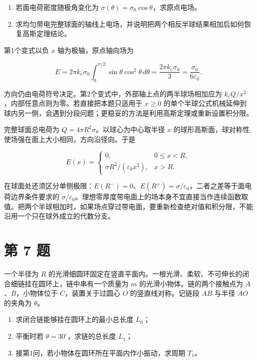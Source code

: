 \documentclass[12pt,a4paper,UTF8]{ctexart}
\newcommand{\tightlist}{\setlength{\itemsep}{0pt}\setlength{\parskip}{0pt}}
\begin{document}
\begin{enumerate}
\def\labelenumi{\arabic{enumi}.}
\tightlist
\item
  若面电荷密度随极角变化为
  \(\sigma(\theta)=\sigma_0\cos\theta\)，求原点电场。
\item
  求均匀带电完整球面的轴线上电场，并说明把两个相反半球结果相加后如何恢复高斯定理结论。
\end{enumerate}

第1个变式以负 \(x\) 轴为极轴，原点轴向场为

\[
E=2\pi k_e\sigma_0
\int_0^{\pi/2}\sin\theta\cos^2\theta\,d\theta
=\frac{2\pi k_e\sigma_0}{3}
=\frac{\sigma_0}{6\varepsilon_0}.
\]

方向仍由电荷符号决定。第2个变式中，外部轴上点的两半球场相加应为
\(k_eQ/x^2\)，内部任意点则为零。若直接把本题只适用于 \(x\ge0\)
的单个半球公式机械延伸到球内另一侧，会遇到分段问题；更稳妥的方法是利用高斯定理或重新设置积分限。

完整球面总电荷为 \(Q=4\pi R^2\sigma\)。以球心为中心取半径 \(x\)
的球形高斯面，球对称性使场强在面上大小相同，方向沿径向。于是

\[E(x)=\begin{cases}0,&0\le x<R,\\ \sigma R^2/(\varepsilon_0x^2),&x>R.\end{cases}\]

在球面处还须区分单侧极限：\(E(R^-)=0\)、\(E(R^+)=\sigma/\varepsilon_0\)，二者之差等于面电荷边界条件要求的
\(\sigma/\varepsilon_0\)。理想零厚度带电面上的场本身不宜直接当作连续函数取值。把两个半球相加时，如果场点穿过带电面，要重新检查绝对值和积分限，不能沿用一个只在球外成立的代数分支。

\newpage

\section{第 7 题}\label{ux7b2c-7-ux9898}

一个半径为 \(R\)
的光滑细圆环固定在竖直平面内。一根光滑、柔软、不可伸长的闭合细链挂在圆环上，链中串有一个质量为
\(m\) 的光滑小物体。链的两个接触点为 \(A\)、\(B\)，小物体位于
\(C\)，装置关于过圆心 \(O\) 的竖直线对称。记链段 \(AB\) 与半径 \(AO\)
的夹角为 \(\theta\)。

\begin{enumerate}
\def\labelenumi{\arabic{enumi}.}
\tightlist
\item
  求闭合链能够挂在圆环上的最小总长度 \(L_0\)；
\item
  平衡时若 \(\theta=30^\circ\)，求链的总长度 \(L_1\)；
\item
  接第1问，若小物体在圆环所在平面内作小振动，求周期 \(T_1\)。
\end{enumerate}
\end{document}
